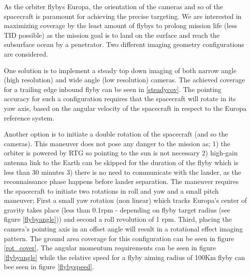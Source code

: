\noindent
As the orbiter flybys Europa, the orientation of the cameras and so of the spacecraft is paramount for achieving the precise targeting. We are interested in maximizing coverage by the least amount of flybys to prolong mission life (less TID possible) as the mission goal is to land on the surface and reach the subsurface ocean by a penetrator. 
Two different imaging geometry configurations are considered. 

One solution is to implement a steady top down imaging of both narrow angle (high resolution) and wide angle (low resolution) cameras. The achieved coverage for a trailing edge inbound flyby can be seen in \ref{steadycov}. The pointing accuracy for such a configuration requires that the spacecraft will rotate in its yaw axis, based on the angular velocity of the spacecraft in respect to the Europa reference system. 

Another option is to initiate a double rotation of the spacecraft (and so the cameras). This maneuver does not pose any danger to the mission as; 1) the orbiter is powered by RTG so pointing to the sun is not necessary 2) high-gain antenna link to the Earth can be skipped for the duration of the flyby which is less than 30 minutes 3) there is no need to communicate with the lander, as the reconnaissance phase happens before lander separation. The maneuver requires the spacecraft to initiate two rotations in roll and yaw and a small pitch maneuver; First a small yaw rotation (non linear) which tracks Europa's center of gravity takes place (less than 0.1rpm - depending on flyby target radius (see figure \ref{flybyangle})) and second a roll revolution of 1 rpm. Third, placing the camera's pointing axis in an offset angle will result in a rotational effect imaging pattern. The ground area coverage for this configuration can be seen in figure \ref{rot_cover}. The angular momentum requirements can be seen in figure \ref{flybyangle} while the relative speed for a flyby aiming radius of 100Km flyby can bee seen in figure \ref{flybyspeed}.

